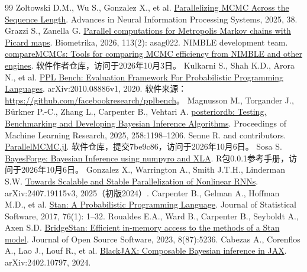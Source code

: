 \begin{thebibliography}{99}\fontsize{10pt}{12pt}\selectfont\setlength{\itemsep}{2pt}
 Zoltowski D.M., Wu S., Gonzalez X., et al. \href{https://proceedings.nips.cc/paper_files/paper/2025/hash/202886ee1c9ca735cb5bff3a00a69883-Abstract-Conference.html}{Parallelizing MCMC Across the Sequence Length}. Advances in Neural Information Processing Systems, 2025, 38.
 Grazzi S., Zanella G. \href{https://doi.org/10.1093/biomet/asag022}{Parallel computations for Metropolis Markov chains with Picard maps}. Biometrika, 2026, 113(2): asag022.
 NIMBLE development team. \href{https://github.com/nimble-dev/compareMCMCs}{compareMCMCs: Tools for comparing MCMC efficiency from NIMBLE and other engines}. 软件作者仓库，访问于2026年10月3日。
 Kulkarni S., Shah K.D., Arora N., et al. \href{https://arxiv.org/abs/2010.08886v1}{PPL Bench: Evaluation Framework For Probabilistic Programming Languages}. arXiv:2010.08886v1, 2020. 软件来源：\url{https://github.com/facebookresearch/pplbench}。
 Magnusson M., Torgander J., Bürkner P.-C., Zhang L., Carpenter B., Vehtari A. \href{https://proceedings.mlr.press/v258/magnusson25a.html}{posteriordb: Testing, Benchmarking and Developing Bayesian Inference Algorithms}. Proceedings of Machine Learning Research, 2025, 258:1198--1206.
 Senne R. and contributors. \href{https://github.com/rsenne/ParallelMCMC.jl/tree/7be9c866c8be03ad994a5e7f0486ec3290088813}{ParallelMCMC.jl}. 软件仓库，提交7be9c86，访问于2026年10月6日。
 Sosa S. \href{https://cran.r-universe.dev/BayesForge/doc/manual.html}{BayesForge: Bayesian Inference using numpyro and XLA}. R包0.0.1参考手册，访问于2026年10月6日。
 Gonzalez X., Warrington A., Smith J.T.H., Linderman S.W. \href{https://arxiv.org/abs/2407.19115v3}{Towards Scalable and Stable Parallelization of Nonlinear RNNs}. arXiv:2407.19115v3, 2025（初版2024）.
 Carpenter B., Gelman A., Hoffman M.D., et al. \href{https://doi.org/10.18637/jss.v076.i01}{Stan: A Probabilistic Programming Language}. Journal of Statistical Software, 2017, 76(1): 1--32.
 Roualdes E.A., Ward B., Carpenter B., Seyboldt A., Axen S.D. \href{https://doi.org/10.21105/joss.05236}{BridgeStan: Efficient in-memory access to the methods of a Stan model}. Journal of Open Source Software, 2023, 8(87):5236.
 Cabezas A., Corenflos A., Lao J., Louf R., et al. \href{https://arxiv.org/abs/2402.10797}{BlackJAX: Composable Bayesian inference in JAX}. arXiv:2402.10797, 2024.

\end{thebibliography}

